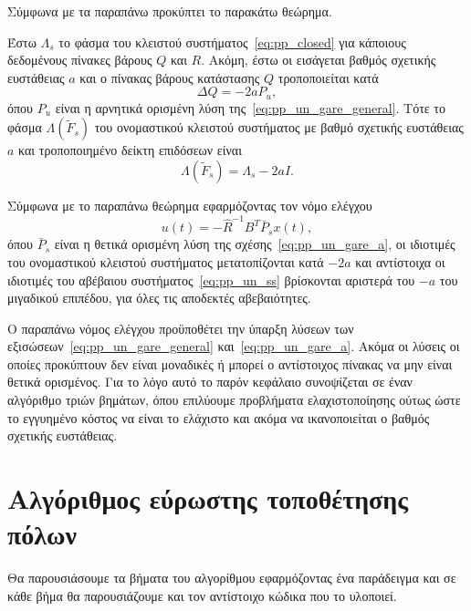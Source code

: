 Σύμφωνα με τα παραπάνω προκύπτει το παρακάτω θεώρημα.
\begin{theorem}
    Έστω \( \Lambda_s \) το φάσμα του κλειστού συστήματος~\eqref{eq:pp_closed}
    για κάποιους δεδομένους πίνακες βάρους \( Q \) και \( R \). Ακόμη, έστω οι
    εισάγεται βαθμός σχετικής ευστάθειας \( a \) και ο πίνακας βάρους
    κατάστασης \( Q \) τροποποιείται κατά
    \[
        \Delta Q = -2aP_u,
    \]
    όπου \( P_u \) είναι η αρνητικά ορισμένη λύση
    της~\eqref{eq:pp_un_gare_general}. Τότε το φάσμα \( \Lambda(\tilde{F}_s) \)
    του ονομαστικού κλειστού συστήματος με βαθμό σχετικής ευστάθειας \( a \)
    και τροποποιημένο δείκτη επιδόσεων είναι
    \[
        \Lambda(\tilde{F}_s) = \Lambda_s - 2aI.
    \]
\end{theorem}
Σύμφωνα με το παραπάνω θεώρημα εφαρμόζοντας τον νόμο ελέγχου
\[
    u(t) = -\hat{R}^{-1}B^T\bar{P}_sx(t),
\]
όπου \( \bar{P}_s \) είναι η θετικά ορισμένη λύση της
σχέσης~\eqref{eq:pp_un_gare_a}, οι ιδιοτιμές του ονομαστικού κλειστού
συστήματος μετατοπίζονται κατά \( -2a \) και αντίστοιχα οι ιδιοτιμές του
αβέβαιου συστήματος~\eqref{eq:pp_un_ss} βρίσκονται αριστερά του \( -a \) του
μιγαδικού επιπέδου, για όλες τις αποδεκτές αβεβαιότητες.

Ο παραπάνω νόμος ελέγχου προϋποθέτει την ύπαρξη λύσεων των
εξισώσεων~\eqref{eq:pp_un_gare_general} και~\eqref{eq:pp_un_gare_a}. Ακόμα οι
λύσεις οι οποίες προκύπτουν δεν είναι μοναδικές ή μπορεί ο αντίστοιχος πίνακας
 να μην είναι θετικά ορισμένος. Για το λόγο αυτό το παρόν κεφάλαιο
συνοψίζεται σε έναν αλγόριθμο τριών βημάτων, όπου επιλύουμε προβλήματα
ελαχιστοποίησης  ούτως ώστε το εγγυημένο κόστος να είναι το ελάχιστο
και ακόμα να ικανοποιείται ο βαθμός σχετικής ευστάθειας.

\section{Αλγόριθμος εύρωστης τοποθέτησης πόλων}
Θα παρουσιάσουμε τα βήματα του αλγορίθμου εφαρμόζοντας ένα παράδειγμα και σε
κάθε βήμα θα παρουσιάζουμε και τον αντίστοιχο κώδικα  που το
υλοποιεί.

